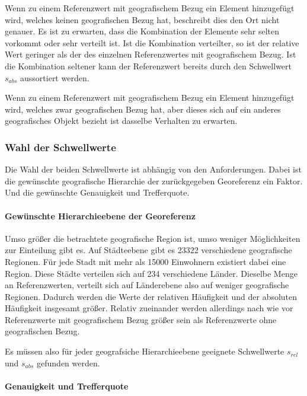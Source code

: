 						Wenn zu einem Referenzwert mit geografischem Bezug ein Element hinzugefügt wird, welches keinen geografischen Bezug hat, beschreibt dies den Ort nicht genauer.
						Es ist zu erwarten, dass die Kombination der Elemente sehr selten vorkommt oder sehr verteilt ist. 
						Ist die Kombination verteilter, so ist der relative Wert geringer als der des einzelnen Referenzwertes mit geografischem Bezug.
						Ist die Kombination seltener kann der Referenzwert bereits durch den Schwellwert $s_{abs}$ aussortiert werden.		

						Wenn zu einem Referenzwert mit geografischem Bezug ein Element hinzugefügt wird, welches zwar geografischen Bezug hat, aber dieses sich auf ein anderes geografisches Objekt bezieht ist dasselbe Verhalten zu erwarten.
						
			\subsubsection{Wahl der Schwellwerte}

				Die Wahl der beiden Schwellwerte ist abhängig von den Anforderungen.
				Dabei ist die gewünschte geografische Hierarchie der zurückgegeben Georeferenz ein Faktor.
				Und die gewünschte Genauigkeit und Trefferquote.
				
				\paragraph{Gewünschte Hierarchieebene der Georeferenz}

					Umso größer die betrachtete geografische Region ist, umso weniger Möglichkeiten zur Einteilung gibt es.
					Auf Städteebene gibt es 23322 verschiedene geografische Regionen. 
					Für jede Stadt mit mehr als 15000 Einwohnern existiert dabei eine Region.
					Diese Städte verteilen sich auf 234 verschiedene Länder.
					Dieselbe Menge an Referenzwerten, verteilt sich auf Länderebene also auf weniger geografische Regionen. 
					Dadurch werden die Werte der relativen Häufigkeit und der absoluten Häufigkeit insgesamt größer.
					Relativ zueinander werden allerdings nach wie vor Referenzwerte mit geografischem Bezug größer sein als Referenzwerte ohne geografischen Bezug.

					Es müssen also für jeder geografsiche Hierarchieebene geeignete Schwellwerte $s_{rel}$ und $s_{abs}$ gefunden werden.

				\paragraph{Genauigkeit und Trefferquote} 

